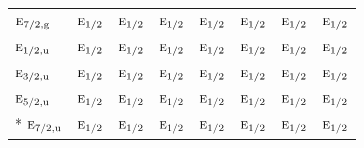 \documentclass[10pt,a4paper]{article}
\numberwithin{equation}{section}
\newcommand{\irr}[1]{\text{\normalfont\scshape #1}}
\newcommand{\ptag}[1]{\mathrm{#1}}
\begin{document}
{\begin{longtable}{@{}lccccccc@{}}
$\irr{e}_{7/2,\ptag{g}}$ & $\irr{e}_{1/2}$ & $\irr{e}_{1/2}$ & $\irr{e}_{1/2}$ & $\irr{e}_{1/2}$ & $\irr{e}_{1/2}$ & $\irr{e}_{1/2}$ & $\irr{e}_{1/2}$\\
$\irr{e}_{1/2,\ptag{u}}$ & $\irr{e}_{1/2}$ & $\irr{e}_{1/2}$ & $\irr{e}_{1/2}$ & $\irr{e}_{1/2}$ & $\irr{e}_{1/2}$ & $\irr{e}_{1/2}$ & $\irr{e}_{1/2}$\\
$\irr{e}_{3/2,\ptag{u}}$ & $\irr{e}_{1/2}$ & $\irr{e}_{1/2}$ & $\irr{e}_{1/2}$ & $\irr{e}_{1/2}$ & $\irr{e}_{1/2}$ & $\irr{e}_{1/2}$ & $\irr{e}_{1/2}$\\
$\irr{e}_{5/2,\ptag{u}}$ & $\irr{e}_{1/2}$ & $\irr{e}_{1/2}$ & $\irr{e}_{1/2}$ & $\irr{e}_{1/2}$ & $\irr{e}_{1/2}$ & $\irr{e}_{1/2}$ & $\irr{e}_{1/2}$\\*
$\irr{e}_{7/2,\ptag{u}}$ & $\irr{e}_{1/2}$ & $\irr{e}_{1/2}$ & $\irr{e}_{1/2}$ & $\irr{e}_{1/2}$ & $\irr{e}_{1/2}$ & $\irr{e}_{1/2}$ & $\irr{e}_{1/2}$\\
\bottomrule\end{longtable}}
\end{document}
